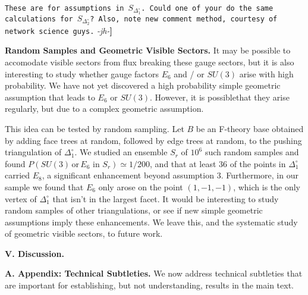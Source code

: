 \documentclass[aps,prl,twocolumn, superscriptaddress,groupedaddress,nofootinbib]{revtex4}
\newcommand{\sdoc}{S_{\Delta_1^\circ}}
\newcommand{\sdtc}{S_{\Delta_2^\circ}}
\newcommand{\doc}{{\Delta_1^\circ}}
\newcommand{\textin}{\,\, \text{in} \,\,}
\newcommand{\XXX}[3]{{\color{blue}{\bf [#1: } {\tt #3} {\it -#2-}{\bf ]}}}
\begin{document}
\XXX{cl,bs}{jh}{These are for assumptions in $\sdoc$. Could one of your do the
same calculations for $\sdtc$? Also, note new comment method, courtesy of
network science guys.}


\vspace{.2cm}
\noindent \textbf{Random Samples and Geometric Visible Sectors.} 
It may be possible to accomodate visible sectors from flux breaking
these gauge sectors, but it is also interesting to study whether gauge
factors $E_6$ and / or $SU(3)$ arise with high probability.
We have not yet discovered a high probability simple geometric assumption
that leads to $E_6$ or $SU(3)$. However, it is possiblethat they arise regularly,
but due to a complex geometric assumption.

This idea can be tested by random sampling. Let $B$ be an F-theory base obtained
by adding face trees at random, followed by edge trees at random, to the pushing 
triangulation of $\doc$. We studied an ensemble $S_r$ of $10^6$ such random samples 
and found $P(SU(3) \, \text{or} \, E_6 \textin S_r)\simeq 1/200$, and that at least 
$36$ of the points in $\doc$ carried $E_8$, a significant enhancement beyond
assumption $3$.  Furthermore, in our sample we found that $E_6$ only
arose on the point $(1,-1,-1)$, which is the only vertex of $\doc$
that isn't in the largest facet. It would be interesting to study random samples of other triangulations, or
see if new simple geometric assumptions imply these enhancements. We leave this,
and the systematic study of geometric visible sectors, to future work.

\vspace{.2cm}
\noindent \textbf{V. Discussion.} 

\vspace{.2cm}
\noindent \textbf{A. Appendix: Technical Subtleties.} We now
address technical subtleties that are important for establishing,
but not understanding, results in the main text.
\end{document}
